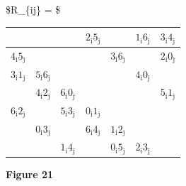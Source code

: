 \documentclass[
  12pt,
  a4paper]{book}
\begin{document}
\$R\_\{ij\} = \$

\begin{longtable}[]{@{}lllclcc@{}}
\toprule
& & & \(2_\mathrm{i}5_\mathrm{j}\) & & \(1_\mathrm{i}6_\mathrm{j}\) &
\(3_\mathrm{i}4_\mathrm{j}\)\tabularnewline
\midrule
\endhead
\(4_\mathrm{i}5_\mathrm{j}\) & & & & \(3_\mathrm{i}6_\mathrm{j}\) & &
\(2_\mathrm{i}0_\mathrm{j}\)\tabularnewline
\(3_\mathrm{i}1_\mathrm{j}\) & \(5_\mathrm{i}6_\mathrm{j}\) & & & &
\(4_\mathrm{i}0_\mathrm{j}\) &\tabularnewline
& \(4_\mathrm{i}2_\mathrm{j}\) & \(6_\mathrm{i}0_\mathrm{j}\) & & & &
\(5_\mathrm{i}1_\mathrm{j}\)\tabularnewline
\(6_\mathrm{i}2_\mathrm{j}\) & & \(5_\mathrm{i}3_\mathrm{j}\) &
\(0_\mathrm{i}1_\mathrm{j}\) & & &\tabularnewline
& \(0_\mathrm{i}3_\mathrm{j}\) & & \(6_\mathrm{i}4_\mathrm{j}\) &
\(1_\mathrm{i}2_\mathrm{j}\) & &\tabularnewline
& & \(1_\mathrm{i}4_\mathrm{j}\) & & \(0_\mathrm{i}5_\mathrm{j}\) &
\(2_\mathrm{i}3_\mathrm{j}\) &\tabularnewline
\bottomrule
\end{longtable}

\textbf{Figure 21}
\end{document}
